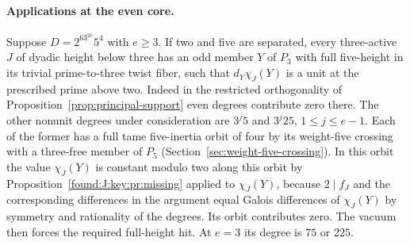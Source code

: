 \documentclass[11pt,a4paper]{article}
\numberwithin{equation}{section}
\theoremstyle{remark}
\begin{document}
\paragraph{Applications at the even core.}
Suppose $D=2^63^{2e}5^4$ with $e\ge3$. If two and five are separated,
every three-active $J$ of dyadic height below three has an odd member
$Y$ of $P_3$ with full five-height in its trivial prime-to-three
twist fiber, such that $d_Y\chi_J(Y)$ is a unit at the prescribed
prime above two. Indeed in the restricted orthogonality of
Proposition~\ref{prop:principal-support} even degrees contribute zero there.
The other nonunit degrees under consideration are $3^j5$ and
$3^j25$, $1\le j\le e-1$. Each of the former has a full tame
five-inertia orbit of four by its weight-five crossing with a three-free member of $P_5$ (Section~\ref{sec:weight-five-crossing}). In this orbit the value
$\chi_J(Y)$ is constant modulo two along this orbit by Proposition~\ref{found:J:key:pr:missing} applied to $\chi_J(Y)$,
because $2\mid f_J$ and the corresponding differences in the argument equal Galois differences of $\chi_J(Y)$ by symmetry and rationality of the degrees. Its orbit contributes
zero. The vacuum then forces the required full-height hit.
At $e=3$ its degree is $75$ or $225$.
\end{document}
